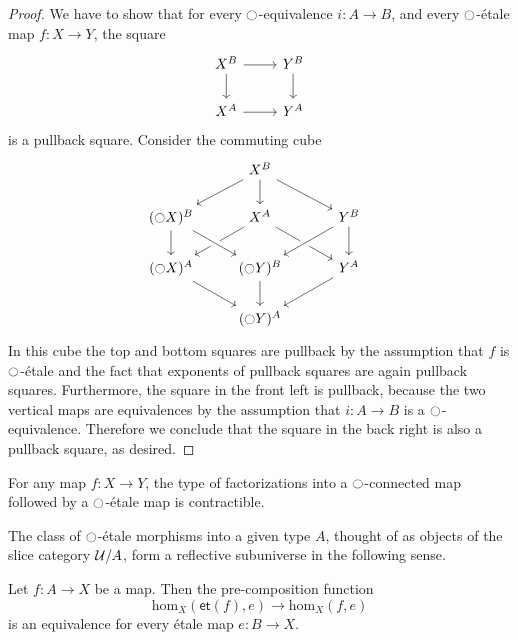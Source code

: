 \begin{proof}
We have to show that for every ${\ocircle}$-equivalence $i:A\to B$, and every ${\ocircle}$-\'etale map $f:X\to Y$, the square
\begin{equation*}
\begin{tikzcd}
X^B \arrow[r] \arrow[d] & Y^B \arrow[d] \\
X^A \arrow[r] & Y^A
\end{tikzcd}
\end{equation*}
is a pullback square. Consider the commuting cube
\begin{equation*}
\begin{tikzcd}
& X^B \arrow[dl] \arrow[d] \arrow[dr] \\
(\modal X)^B \arrow[d] & X^A \arrow[dl] \arrow[dr] & Y^B \arrow[d] \arrow[dl,crossing over] \\
(\modal X)^A \arrow[dr] & (\modal Y)^B \arrow[from=ul,crossing over] \arrow[d] & Y^A \arrow[dl] \\
& (\modal Y)^A & \phantom{(\modal X)^B}
\end{tikzcd}
\end{equation*}
In this cube the top and bottom squares are pullback by the assumption that $f$ is ${\ocircle}$-\'etale and the fact that exponents of pullback squares are again pullback squares. Furthermore, the square in the front left is pullback, because the two vertical maps are equivalences by the assumption that $i:A\to B$ is a ${\ocircle}$-equivalence. Therefore we conclude that the square in the back right is also a pullback square, as desired.
\end{proof}

\begin{cor}
For any map $f:X\to Y$, the type of factorizations into a ${\ocircle}$-connected map followed by a ${\ocircle}$-\'etale map is contractible.
\end{cor}

The class of ${\ocircle}$-\'etale morphisms into a given type $A$, thought of as objects of the slice category $\mathcal{U}/A$, form a reflective subuniverse in the following sense.

\begin{thm}
Let $f:A\to X$ be a map. Then the pre-composition function
\begin{equation*}
\mathrm{hom}_X(\mathsf{et}(f),e)\to \mathrm{hom}_X(f,e)
\end{equation*}
is an equivalence for every \'etale map $e:B\to X$. 
\end{thm}

